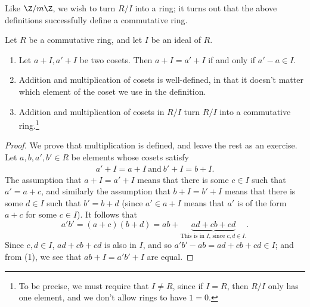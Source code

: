 \documentclass[math1530-lecture-notes]{subfiles}
\begin{document}
Like $\Z / m\Z$, we wish to turn $R / I$ into a ring; it turns out that the above definitions
successfully define a commutative ring.

\begin{proposition}[]{}
  Let $R$ be a commutative ring, and let $I$ be an ideal of $R$.
  \begin{enumerate}
    \item Let $a+I,a'+I$ be two cosets. Then $a+I=a'+I$ if and only if $a'-a\in I$.
    \item Addition and multiplication of cosets is well-defined, in that it doesn't matter which
      element of the coset we use in the definition.
    \item Addition and multiplication of cosets in $R / I$ turn $R / I$ into a commutative
      ring.\footnote{To be precise, we must require that $I\neq R$, since if $I=R$, then $R/I$ only
      has one element, and we don't allow rings to have $1=0$.}
  \end{enumerate}
\end{proposition}
\begin{proof}[Proof]
  We prove that multiplication is defined, and leave the rest as an exercise. Let $a,b,a',b'\in
  R$ be elements whose cosets satisfy
  \begin{align*}
    a'+I=a+I ~\text{and}~b'+I=b+I
  .\end{align*} The assumption that $a+I=a'+I$ means that there is some $c\in I$ such that $a'=a+c$,
  and similarly the assumption that $b+I=b'+I$ means that there is some $d\in I$ such that $b'=b+d$
  (since $a'\in a+I$ means that $a'$ is of the form $a+c$ for some $c\in I$). It follows that \[
    a'b'=(a+c)(b+d)=ab+\underbrace{ad+cb+cd}_\text{This is in $I$, since $c,d\in I$.}
  .\] Since $c,d\in I$, $ad+cb+cd$ is also in $I$, and so $a'b'-ab=ad+cb+cd \in I$; and from (1), we
  see that $ab+I=a'b'+I$ are equal.
\end{proof}
\end{document}

